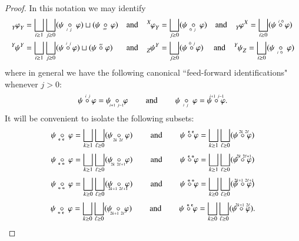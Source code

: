 \documentclass{amsart}
\def\tn{\textnormal}
\def\hsp{\hspace{.3in}}
\def\bfe{{\bf e}}
\def\bfo{{\bf o}}
\newcommand{\feeddd}[3]{{\tensor*[^{#2}_{\color{white}{!}}]{{#1}}{^{#3}}}}%
\newcommand{\feeddc}[3]{{\tensor*[^{#2}]{{#1}}{_{#3}}}}
\newcommand{\feedcd}[3]{{\tensor*[_{#2}]{{#1}}{^{#3}}}}
\newcommand{\feedcc}[3]{{\tensor*[^{\color{white}{!}}_{#2}]{{#1}}{_{#3}}}}
\theoremstyle{remark}
\theoremstyle{definition}
\begin{document}
\begin{proof}
In this notation we may identify 
\begin{align*}
 \feedcc{\varphi}{Y}{Y}
 &=\bigsqcup_{i\ge1}\bigsqcup_{j\ge0}(\psi\;\underaccent{\,\ i\ j}{\circ}\;\varphi)\sqcup(\psi\,\underaccent{\;\ \infty}{\circ}\,\varphi)
 \quad\tn{and}\quad
 \feeddc{\varphi}{X}{Y}=\bigsqcup_{j\ge0}(\psi\;\underaccent{\,\ 0\ j}{\circ}\;\varphi)
 \quad\tn{and}\quad
 \feedcd{\varphi}{Y}{X}=\bigsqcup_{i\ge0}(\psi\;\accentset{\,i\ 0}{\circ}\;\varphi)\\
 \feeddd{\psi}{Y}{Y}
 &=\bigsqcup_{i\ge1}\bigsqcup_{j\ge0}(\psi\;\accentset{\,i\ j}{\circ}\;\varphi)\sqcup(\psi\;\accentset{\infty}{\circ}\;\varphi)
 \quad\quad\!\!\tn{and}\quad
 \feedcd{\psi}{Z}{Y}=\bigsqcup_{j\ge0}(\psi\;\accentset{\,0\ j}{\circ}\;\varphi)
 \ \quad\tn{and}\quad
 \feeddc{\psi}{Y}{Z}=\bigsqcup_{i\ge0}(\psi\;\underaccent{\,\ i\ 0}{\circ}\;\varphi)
\end{align*}
where in general we have the following canonical ``feed-forward identifications" whenever $j>0$:
\[\psi\;\accentset{\,i\ j}{\circ}\;\varphi=\psi\;\underaccent{\,\,\ i+1\ j-1}{\circ}\;\varphi\hsp\tn{and}\hsp\psi\;\underaccent{\,\ i\ j}{\circ}\;\varphi=\psi\;\accentset{\,i+1\ j-1}{\circ}\;\varphi.\]
It will be convenient to isolate the following subsets:
\[\psi\;\underaccent{\,\ \bfe\ \bfe}{\circ}\;\varphi=\bigsqcup_{k\ge1}\bigsqcup_{\ell\ge0}(\psi\;\underaccent{\,\ 2k\ 2\ell}{\circ}\;\varphi)\hsp\tn{and}\hsp\psi\;\accentset{\,\ \bfe\ \bfe}{\circ}\;\varphi=\bigsqcup_{k\ge1}\bigsqcup_{\ell\ge0}(\psi\;\accentset{\,\ 2k\ 2\ell}{\circ}\;\varphi)\]
\[\psi\;\underaccent{\,\ \bfe\ \bfo}{\circ}\;\varphi=\bigsqcup_{k\ge1}\bigsqcup_{\ell\ge0}(\psi\;\underaccent{\,\ 2k\ 2\ell+1}{\circ}\;\varphi)\hsp\tn{and}\hsp\psi\;\accentset{\,\ \bfe\ \bfo}{\circ}\;\varphi=\bigsqcup_{k\ge1}\bigsqcup_{\ell\ge0}(\psi\;\accentset{\,\ 2k\ 2\ell+1}{\circ}\;\varphi)\]
\[\psi\;\underaccent{\,\ \bfo\ \bfo}{\circ}\;\varphi=\bigsqcup_{k\ge0}\bigsqcup_{\ell\ge0}(\psi\;\underaccent{\,\ 2k+1\ 2\ell+1}{\circ}\;\varphi)\hsp\tn{and}\hsp\psi\;\accentset{\,\ \bfo\ \bfo}{\circ}\;\varphi=\bigsqcup_{k\ge0}\bigsqcup_{\ell\ge0}(\psi\;\accentset{\,\ 2k+1\ 2\ell+1}{\circ}\;\varphi)\]
\[\psi\;\underaccent{\,\ \bfo\ \bfe}{\circ}\;\varphi=\bigsqcup_{k\ge0}\bigsqcup_{\ell\ge0}(\psi\;\underaccent{\,\ 2k+1\ 2\ell}{\circ}\;\varphi)\hsp\tn{and}\hsp\psi\;\accentset{\,\ \bfo\ \bfe}{\circ}\;\varphi=\bigsqcup_{k\ge0}\bigsqcup_{\ell\ge0}(\psi\;\accentset{\,\ 2k+1\ 2\ell}{\circ}\;\varphi).\]


\end{proof}
\end{document}
